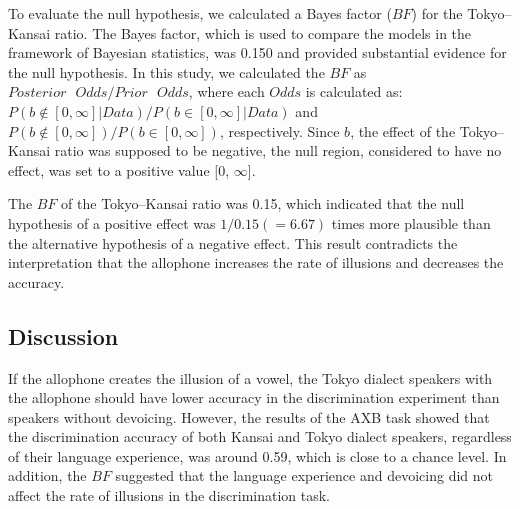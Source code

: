 \documentclass[a4paper,11pt,twocolumn]{article}
\begin{document}
To evaluate the null hypothesis, we calculated a Bayes factor ($BF$) for the Tokyo--Kansai ratio. The Bayes factor, which is used to compare the models in the framework of Bayesian statistics, was 0.150 and provided substantial evidence for the null hypothesis. In this study, we calculated the $BF$ as $Posterior \text{ }Odds / Prior \text{ }Odds$, where each $Odds$ is calculated as: $P(b\notin[0, \infty] | Data)/P(b\in[0, \infty] | Data)$ and $P(b\notin[0, \infty])/P(b\in[0, \infty])$, respectively. Since $b$, the effect of the Tokyo--Kansai ratio was supposed to be negative, the null region\cite{kruschke2010believe}, considered to have no effect, was set to a positive value [0, $\infty$].


The $BF$ of the Tokyo--Kansai ratio was 0.15, which indicated that the null hypothesis of a positive effect was $1/0.15(=6.67)$ times more plausible than the alternative hypothesis of a negative effect. This result contradicts the interpretation that the allophone increases the rate of illusions and decreases the accuracy.

\subsection{Discussion}

If the allophone creates the illusion of a vowel, the Tokyo dialect speakers with the allophone should have lower accuracy in the discrimination experiment than speakers without devoicing. However, the results of the AXB task showed that the discrimination accuracy of both Kansai and Tokyo dialect speakers, regardless of their language experience, was around 0.59, which is close to a chance level. In addition, the $BF$ suggested that the language experience and devoicing did not affect the rate of illusions in the discrimination task.

\end{document}
